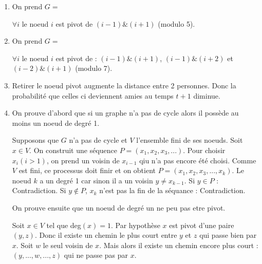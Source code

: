 \begin{enumerate}
	\item On prend $G = $
\begin{center}
\end{center}
$\forall i$ le noeud $i$ est pivot de $(i-1)\&(i+1)$ (modulo 5).

	\item On prend $G = $
\begin{center}
\end{center}

$\forall i$ le noeud $i$ est pivot de :
$(i-1) \& (i+1)$, $(i-1) \& (i+2)$ et $(i-2) \& (i+1)$
(modulo 7).
	\item Retirer le noeud pivot augmente la distance entre 2 personnes. Donc la probabilité que celles ci deviennent amies au temps $t+1$ diminue.

	\item On prouve d'abord que si un graphe n'a pas de cycle alors il possède au moins un noeud de degré 1.

Supposons que $G$ n'a pas de cycle et $V$ l'ensemble fini de ses noeuds.
Soit $x \in V$. On construit une séquence $P = (x_1, x_2, x_3, ...)$. Pour choisir $x_i (i>1)$, on prend un voisin de $x_{i-1}$ qiu n'a pas encore été choisi. Comme $V$ est fini, ce processus doit finir et on obtient $P= (x_1, x_2, x_3,...,x_k)$.
Le noeud $k$ a un degré 1 car sinon il a un voisin $y\neq x_{k-1}$. Si $y \in P$ : Contradiction.
Si $y \notin P$, $x_k$ n'est pas la fin de la séquance : Contradiction.

On prouve ensuite que un noeud de degré un ne peu pas etre pivot.

Soit $x\in V$ tel que deg$(x)=1$.
Par hypothèse $x$ est pivot d'une paire $(y,z)$.
Donc il existe un chemin le plus court entre $y$ et $z$ qui passe bien par $x$.
Soit $w$ le seul voisin de $x$.
Mais alors il existe un chemin encore plus court : $(y, ..., w,...,z)$ qui ne passe pas par $x$.


\end{enumerate}
